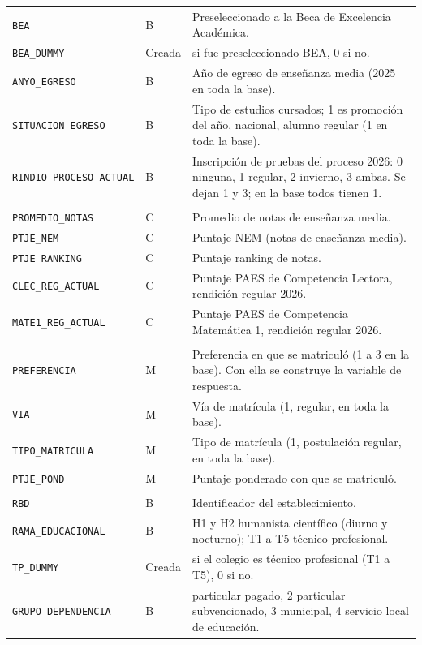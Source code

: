 \documentclass[11pt]{article}
\begin{document}
\begin{longtable}{>{\raggedright\arraybackslash}p{5.4cm}
                  >{\raggedright\arraybackslash}p{1.4cm}
                  >{\raggedright\arraybackslash}p{6.6cm}}
\texttt{BEA} & B & Preseleccionado a la Beca de Excelencia Académica. \\
\texttt{BEA\_DUMMY} & Creada & 1 si fue preseleccionado BEA, 0 si no. \\
\texttt{ANYO\_EGRESO} & B & Año de egreso de enseñanza media (2025 en toda la base). \\
\texttt{SITUACION\_EGRESO} & B & Tipo de estudios cursados; 1 es promoción del año, nacional, alumno regular (1 en toda la base). \\
\texttt{RINDIO\_PROCESO\_ACTUAL} & B & Inscripción de pruebas del proceso 2026: 0 ninguna, 1 regular, 2 invierno, 3 ambas. Se dejan 1 y 3; en la base todos tienen 1. \\
\midrule
\multicolumn{3}{l}{\textit{Notas y puntajes}} \\
\texttt{PROMEDIO\_NOTAS} & C & Promedio de notas de enseñanza media. \\
\texttt{PTJE\_NEM} & C & Puntaje NEM (notas de enseñanza media). \\
\texttt{PTJE\_RANKING} & C & Puntaje ranking de notas. \\
\texttt{CLEC\_REG\_ACTUAL} & C & Puntaje PAES de Competencia Lectora, rendición regular 2026. \\
\texttt{MATE1\_REG\_ACTUAL} & C & Puntaje PAES de Competencia Matemática 1, rendición regular 2026. \\
\midrule
\multicolumn{3}{l}{\textit{Matrícula}} \\
\texttt{PREFERENCIA} & M & Preferencia en que se matriculó (1 a 3 en la base). Con ella se construye la variable de respuesta. \\
\texttt{VIA} & M & Vía de matrícula (1, regular, en toda la base). \\
\texttt{TIPO\_MATRICULA} & M & Tipo de matrícula (1, postulación regular, en toda la base). \\
\texttt{PTJE\_POND} & M & Puntaje ponderado con que se matriculó. \\
\midrule
\multicolumn{3}{l}{\textit{Colegio de egreso}} \\
\texttt{RBD} & B & Identificador del establecimiento. \\
\texttt{RAMA\_EDUCACIONAL} & B & H1 y H2 humanista científico (diurno y nocturno); T1 a T5 técnico profesional. \\
\texttt{TP\_DUMMY} & Creada & 1 si el colegio es técnico profesional (T1 a T5), 0 si no. \\
\texttt{GRUPO\_DEPENDENCIA} & B & 1 particular pagado, 2 particular subvencionado, 3 municipal, 4 servicio local de educación. \\

\end{longtable}
\end{document}

